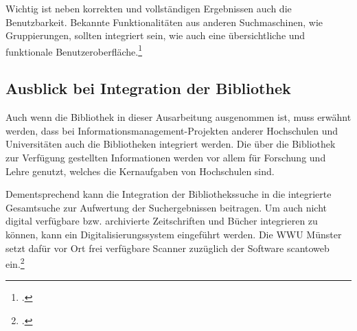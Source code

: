 Wichtig ist neben korrekten und vollständigen Ergebnissen auch die Benutzbarkeit. Bekannte Funktionalitäten aus anderen Suchmaschinen, wie Gruppierungen, sollten integriert sein, wie auch eine übersichtliche und funktionale Benutzeroberfläche.\footcite[Vgl.][43]{vogl_fortschritte_2012}

\subsection{Ausblick bei Integration der Bibliothek}
Auch wenn die Bibliothek in dieser Ausarbeitung ausgenommen ist, muss erwähnt werden, dass bei Informationsmanagement-Projekten anderer Hochschulen und Universitäten auch die Bibliotheken integriert werden. Die über die Bibliothek zur Verfügung gestellten Informationen werden vor allem für Forschung und Lehre genutzt, welches die Kernaufgaben von Hochschulen sind.

Dementsprechend kann die Integration der Bibliothekssuche in die integrierte Gesamtsuche zur Aufwertung der Suchergebnissen beitragen. Um auch nicht digital verfügbare bzw. archivierte Zeitschriften und Bücher integrieren zu können, kann ein Digitalisierungssystem eingeführt werden. Die WWU Münster setzt dafür vor Ort frei verfügbare Scanner zuzüglich der Software scantoweb ein.\footcite[Vgl.][50]{vogl_fortschritte_2012}
